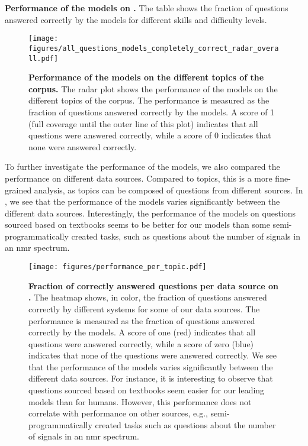\begin{table}
    \caption{\textbf{Performance of the models on \chembenchmini.} The table shows the fraction of questions answered correctly by the models for different skills and difficulty levels.}
    \label{tab:performance_table_human_subset}
\end{table}

\begin{figure}[htb]
    \centering
    \texttt{[image: figures/all\_questions\_models\_completely\_correct\_radar\_overall.pdf]}
    \caption{\textbf{Performance of the models on the different topics of the \chembench corpus.} The radar plot shows the performance of the models on the different topics of the \chembench corpus. The performance is measured as the fraction of questions answered correctly by the models.
    A score of 1 (full coverage until the outer line of this plot) indicates that all questions were answered correctly, while a score of 0 indicates that none were answered correctly.
    }
    \label{fig:all_questions_models_completely_correct_radar_overall}
\end{figure}




To further investigate the performance of the models, we also compared the performance on different data sources.
Compared to topics, this is a more fine-grained analysis, as topics can be composed of questions from different sources.
In , we see that the performance of the models varies significantly between the different data sources.
Interestingly, the performance of the models on questions sourced based on textbooks seems to be better for our models than some semi-programmatically created tasks, such as questions about the number of signals in an \gls{nmr} spectrum.


\begin{figure}[htb]
    \centering
    \texttt{[image: figures/performance\_per\_topic.pdf]}
    \caption{\textbf{Fraction of correctly answered questions per data source on \chembenchmini.} The heatmap shows, in color, the fraction of questions answered correctly by different systems for some of our data sources. The performance is measured as the fraction of questions answered correctly by the models. A score of one (red) indicates that all questions were answered correctly, while a score of zero (blue) indicates that none of the questions were answered correctly.
        We see that the performance of the models varies significantly between the different data sources. For instance, it is interesting to observe that questions sourced based on textbooks seem easier for our leading models than for humans. However, this performance does not correlate with performance on other sources, e.g., semi-programmatically created tasks such as questions about the number of signals in an \gls{nmr} spectrum.
    }
    \label{fig:performance_per_topic}
\end{figure}

